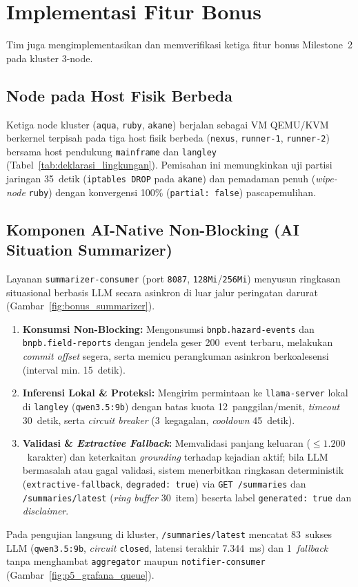 \clearpage
\section{Implementasi Fitur Bonus}
\label{sec:fitur_bonus}

Tim juga mengimplementasikan dan memverifikasi ketiga fitur bonus Milestone~2 pada kluster 3-node.

\subsection{Node pada Host Fisik Berbeda}
Ketiga node kluster (\texttt{aqua}, \texttt{ruby}, \texttt{akane}) berjalan sebagai VM QEMU/KVM berkernel terpisah pada tiga host fisik berbeda (\texttt{nexus}, \texttt{runner-1}, \texttt{runner-2}) bersama host pendukung \texttt{mainframe} dan \texttt{langley} (Tabel~\ref{tab:deklarasi_lingkungan}). Pemisahan ini memungkinkan uji partisi jaringan 35~detik (\texttt{iptables DROP} pada \texttt{akane}) dan pemadaman penuh (\textit{wipe-node} \texttt{ruby}) dengan konvergensi 100\% (\texttt{partial: false}) pascapemulihan.

\subsection{Komponen AI-Native Non-Blocking (AI Situation Summarizer)}
Layanan \texttt{summarizer-consumer} (port \texttt{8087}, \texttt{128Mi}/\texttt{256Mi}) menyusun ringkasan situasional berbasis LLM secara asinkron di luar jalur peringatan darurat (Gambar~\ref{fig:bonus_summarizer}).
\begin{enumerate}
    \item \textbf{Konsumsi Non-Blocking:} Mengonsumsi \texttt{bnpb.hazard-events} dan \texttt{bnpb.field-reports} dengan jendela geser 200~event terbaru, melakukan \textit{commit offset} segera, serta memicu perangkuman asinkron berkoalesensi (interval min. 15~detik).
    \item \textbf{Inferensi Lokal \& Proteksi:} Mengirim permintaan ke \texttt{llama-server} lokal di \texttt{langley} (\texttt{qwen3.5:9b}) dengan batas kuota 12~panggilan/menit, \textit{timeout} 30~detik, serta \textit{circuit breaker} (3~kegagalan, \textit{cooldown} 45~detik).
    \item \textbf{Validasi \& \textit{Extractive Fallback}:} Memvalidasi panjang keluaran ($\le 1.200$~karakter) dan keterkaitan \textit{grounding} terhadap kejadian aktif; bila LLM bermasalah atau gagal validasi, sistem menerbitkan ringkasan deterministik (\texttt{extractive-fallback}, \texttt{degraded: true}) via \texttt{GET /summaries} dan \texttt{/summaries/latest} (\textit{ring buffer} 30~item) beserta label \texttt{generated: true} dan \textit{disclaimer}.
\end{enumerate}
Pada pengujian langsung di kluster, \texttt{/summaries/latest} mencatat 83~sukses LLM (\texttt{qwen3.5:9b}, \textit{circuit} \texttt{closed}, latensi terakhir 7.344~ms) dan 1~\textit{fallback} tanpa menghambat \texttt{aggregator} maupun \texttt{notifier-consumer} (Gambar~\ref{fig:p5_grafana_queue}).

